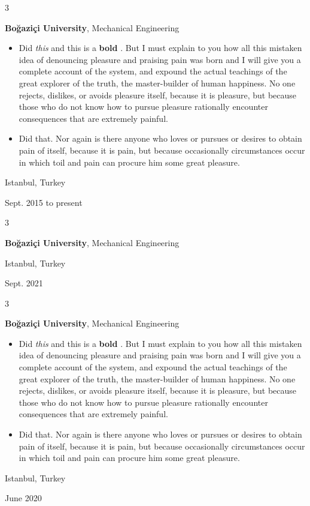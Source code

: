 \documentclass[10pt, letterpaper]{article}
\newenvironment{highlights}{
    \begin{itemize}[
        topsep=0.10 cm,
        parsep=0.10 cm,
        partopsep=0pt,
        itemsep=0pt,
        leftmargin=0.4 cm + 10pt
    ]
}{
    \end{itemize}
} %
\newenvironment{threecolentry}[3][]{
    \onecolentry
    \def\thirdColumn{#3}
    \setcolumnwidth{1 cm, \fill, 4.5 cm}
    \begin{paracol}{3}
    {\raggedright #2} \switchcolumn
}{
    \switchcolumn \raggedleft \thirdColumn
    \end{paracol}
    \endonecolentry
} %
\let\hrefWithoutArrow\href
\renewcommand{\href}[2]{\hrefWithoutArrow{#1}{\mbox{\ifthenelse{\equal{#2}{}}{ }{#2 }\raisebox{.15ex}{\footnotesize \faExternalLink*}}}}
\begin{document}
        \begin{threecolentry}{\textbf{}}{
            Istanbul, Turkey

        Sept. 2015 to present
        }
            \textbf{Boğaziçi University}, Mechanical Engineering
            \begin{highlights}
                \item Did \textit{this} and this is a \textbf{bold} \href{https://example.com}{link}. But I must explain to you how all this mistaken idea of denouncing pleasure and praising pain was born and I will give you a complete account of the system, and expound the actual teachings of the great explorer of the truth, the master-builder of human happiness. No one rejects, dislikes, or avoids pleasure itself, because it is pleasure, but because those who do not know how to pursue pleasure rationally encounter consequences that are extremely painful.
                \item Did that. Nor again is there anyone who loves or pursues or desires to obtain pain of itself, because it is pain, but because occasionally circumstances occur in which toil and pain can procure him some great pleasure.
            \end{highlights}
        \end{threecolentry}

        \vspace{0.2 cm}

        \begin{threecolentry}{\textbf{}}{
            Istanbul, Turkey

        Sept. 2021
        }
            \textbf{Boğaziçi University}, Mechanical Engineering
        \end{threecolentry}

        \vspace{0.2 cm}

        \begin{threecolentry}{\textbf{}}{
            Istanbul, Turkey

        June 2020
        }
            \textbf{Boğaziçi University}, Mechanical Engineering
            \begin{highlights}
                \item Did \textit{this} and this is a \textbf{bold} \href{https://example.com}{link}. But I must explain to you how all this mistaken idea of denouncing pleasure and praising pain was born and I will give you a complete account of the system, and expound the actual teachings of the great explorer of the truth, the master-builder of human happiness. No one rejects, dislikes, or avoids pleasure itself, because it is pleasure, but because those who do not know how to pursue pleasure rationally encounter consequences that are extremely painful.
                \item Did that. Nor again is there anyone who loves or pursues or desires to obtain pain of itself, because it is pain, but because occasionally circumstances occur in which toil and pain can procure him some great pleasure.
            \end{highlights}
        \end{threecolentry}
\end{document}
